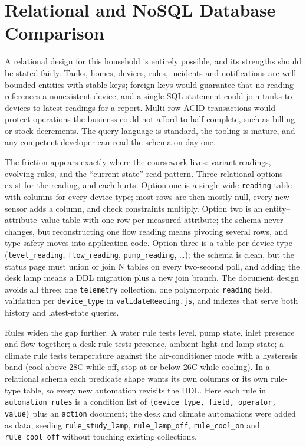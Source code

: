 \documentclass[11pt,a4paper]{article}
\begin{document}
\section{Relational and NoSQL Database Comparison}

A relational design for this household is entirely possible, and its strengths should be stated fairly. Tanks, homes, devices, rules, incidents and notifications are well-bounded entities with stable keys; foreign keys would guarantee that no reading references a nonexistent device, and a single SQL statement could join tanks to devices to latest readings for a report. Multi-row ACID transactions would protect operations the business could not afford to half-complete, such as billing or stock decrements. The query language is standard, the tooling is mature, and any competent developer can read the schema on day one.

The friction appears exactly where the coursework lives: variant readings, evolving rules, and the ``current state'' read pattern. Three relational options exist for the reading, and each hurts. Option one is a single wide \texttt{reading} table with columns for every device type; most rows are then mostly null, every new sensor adds a column, and check constraints multiply. Option two is an entity--attribute--value table with one row per measured attribute; the schema never changes, but reconstructing one flow reading means pivoting several rows, and type safety moves into application code. Option three is a table per device type (\texttt{level\_reading}, \texttt{flow\_reading}, \texttt{pump\_reading}, \ldots); the schema is clean, but the status page must union or join N tables on every two-second poll, and adding the desk lamp means a DDL migration plus a new join branch. The document design avoids all three: one \texttt{telemetry} collection, one polymorphic \texttt{reading} field, validation per \texttt{device\_type} in \texttt{validateReading.js}, and indexes that serve both history and latest-state queries.

Rules widen the gap further. A water rule tests level, pump state, inlet presence and flow together; a desk rule tests presence, ambient light and lamp state; a climate rule tests temperature against the air-conditioner mode with a hysteresis band (cool above 28\textdegree C while off, stop at or below 26\textdegree C while cooling). In a relational schema each predicate shape wants its own columns or its own rule-type table, so every new automation revisits the DDL. Here each rule in \texttt{automation\_rules} is a condition list of \texttt{\{device\_type, field, operator, value\}} plus an \texttt{action} document; the desk and climate automations were added as data, seeding \texttt{rule\_study\_lamp}, \texttt{rule\_lamp\_off}, \texttt{rule\_cool\_on} and \texttt{rule\_cool\_off} without touching existing collections.
\end{document}
